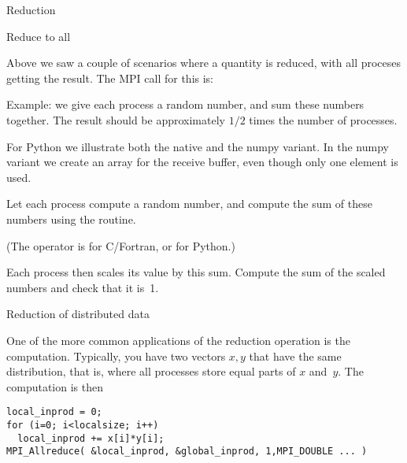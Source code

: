 
 {Reduction}

 {Reduce to all}
\label{sec:allreduce}

Above we saw a couple of scenarios where a quantity is reduced, with
all proceses getting the result. The MPI call for this is:


Example: we give each process a random number, and sum these numbers together.
The result should be approximately $1/2$ times the number of processes.


For Python we illustrate both the native and the numpy variant. In the
numpy variant we create an array for the receive buffer, even though
only one element is used.


\begin{exercise}
  \label{ex:randommaxscale}
  Let each process compute a random number,
  and compute the sum of these numbers using the 
  routine.

  (The operator is  for C/Fortran, or  for
  Python.)
  
  Each process then scales its value
  by this sum. Compute the sum of the scaled numbers and check that it is~1.
\end{exercise}

 {Reduction of distributed data}
\label{sec:dist-reduc}

One of the more common applications of the reduction operation
is the  computation. Typically, you have two vectors $x,y$
that have the same distribution, that is,
where all processes store equal parts of $x$ and~$y$.
The computation is then
\begin{lstlisting}
local_inprod = 0;
for (i=0; i<localsize; i++)
  local_inprod += x[i]*y[i];
MPI_Allreduce( &local_inprod, &global_inprod, 1,MPI_DOUBLE ... ) 
\end{lstlisting}

